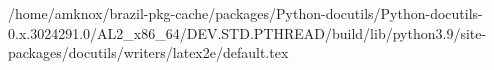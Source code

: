 /home/amknox/brazil-pkg-cache/packages/Python-docutils/Python-docutils-0.x.3024291.0/AL2_x86_64/DEV.STD.PTHREAD/build/lib/python3.9/site-packages/docutils/writers/latex2e/default.tex